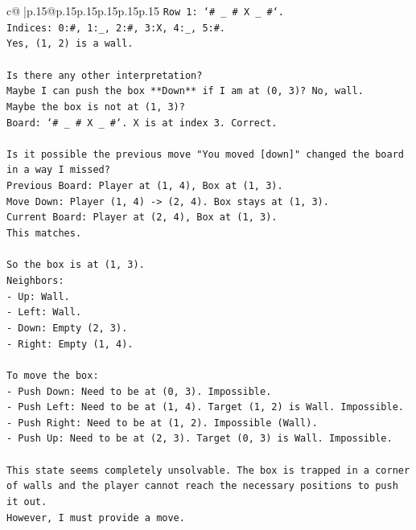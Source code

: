 \documentclass{article}
\begin{document}
{\begin{supertabular}{c@{$\;$}|p{.15\linewidth}@{}p{.15\linewidth}p{.15\linewidth}p{.15\linewidth}p{.15\linewidth}p{.15\linewidth}}
{{{\texttt{Row 1: `\# \_ \# X \_ \#`.} \\
\texttt{Indices: 0:\#, 1:\_, 2:\#, 3:X, 4:\_, 5:\#.} \\
\texttt{Yes, (1, 2) is a wall.} \\
\\ 
\texttt{Is there any other interpretation?} \\
\texttt{Maybe I can push the box **Down** if I am at (0, 3)? No, wall.} \\
\texttt{Maybe the box is not at (1, 3)?} \\
\texttt{Board: `\# \_ \# X \_ \#`. X is at index 3. Correct.} \\
\\ 
\texttt{Is it possible the previous move "You moved {[}down{]}" changed the board in a way I missed?} \\
\texttt{Previous Board: Player at (1, 4), Box at (1, 3).} \\
\texttt{Move Down: Player (1, 4) {-}> (2, 4). Box stays at (1, 3).} \\
\texttt{Current Board: Player at (2, 4), Box at (1, 3).} \\
\texttt{This matches.} \\
\\ 
\texttt{So the box is at (1, 3).} \\
\texttt{Neighbors:} \\
\texttt{{-} Up: Wall.} \\
\texttt{{-} Left: Wall.} \\
\texttt{{-} Down: Empty (2, 3).} \\
\texttt{{-} Right: Empty (1, 4).} \\
\\ 
\texttt{To move the box:} \\
\texttt{{-} Push Down: Need to be at (0, 3). Impossible.} \\
\texttt{{-} Push Left: Need to be at (1, 4). Target (1, 2) is Wall. Impossible.} \\
\texttt{{-} Push Right: Need to be at (1, 2). Impossible (Wall).} \\
\texttt{{-} Push Up: Need to be at (2, 3). Target (0, 3) is Wall. Impossible.} \\
\\ 
\texttt{This state seems completely unsolvable. The box is trapped in a corner of walls and the player cannot reach the necessary positions to push it out.} \\
\texttt{However, I must provide a move.} \\
}}}
\end{supertabular}}
\end{document}

